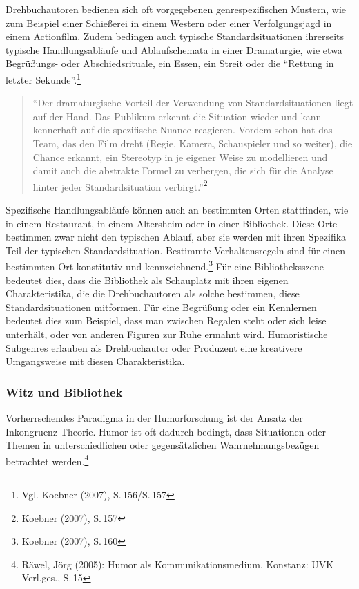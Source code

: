 Drehbuchautoren bedienen sich oft vorgegebenen genrespezifischen
Mustern, wie zum Beispiel einer Schießerei in einem Western oder einer
Verfolgungsjagd in einem Actionfilm. Zudem bedingen auch typische
Standardsituationen ihrerseits typische Handlungsabläufe und
Ablaufschemata in einer Dramaturgie, wie etwa Begrüßungs- oder
Abschiedsrituale, ein Essen, ein Streit oder die \enquote{Rettung in
letzter Sekunde}.\footnote{Vgl. Koebner (2007), S.\,156/S.\,157}

\begin{flushleft}
\begin{quote}
\enquote{Der dramaturgische Vorteil der Verwendung von
Standardsituationen liegt auf der Hand. Das Publikum erkennt die
Situation wieder und kann kennerhaft auf die spezifische Nuance
reagieren. Vordem schon hat das Team, das den Film dreht (Regie, Kamera,
Schauspieler und so weiter), die Chance erkannt, ein Stereotyp in je
eigener Weise zu modellieren und damit auch die abstrakte Formel zu
verbergen, die sich für die Analyse hinter jeder Standardsituation
verbirgt.}\footnote{Koebner (2007), S.\,157}
\end{quote}
\end{flushleft}

Spezifische Handlungsabläufe können auch an bestimmten Orten
stattfinden, wie in einem Restaurant, in einem Altersheim oder in einer
Bibliothek. Diese Orte bestimmen zwar nicht den typischen Ablauf, aber
sie werden mit ihren Spezifika Teil der typischen Standardsituation.
Bestimmte Verhaltensregeln sind für einen bestimmten Ort konstitutiv und
kennzeichnend.\footnote{Koebner (2007), S.\,160} Für eine
Bibliotheksszene bedeutet dies, dass die Bibliothek als Schauplatz mit
ihren eigenen Charakteristika, die die Drehbuchautoren als solche
bestimmen, diese Standardsituationen mitformen. Für eine
Begrüßung oder ein Kennlernen bedeutet dies zum
Beispiel, dass man zwischen Regalen steht oder sich leise unterhält,
oder von anderen Figuren zur Ruhe ermahnt wird. Humoristische Subgenres
erlauben als Drehbuchautor oder Produzent eine kreativere Umgangsweise
mit diesen Charakteristika.

\subsubsection{Witz und Bibliothek}\label{witz-und-bibliothek}

Vorherrschendes Paradigma in der Humorforschung ist der Ansatz der
Inkongruenz-Theorie. Humor ist oft dadurch bedingt, dass Situationen
oder Themen in unterschiedlichen oder gegensätzlichen
Wahrnehmungsbezügen betrachtet werden.\footnote{Räwel, Jörg (2005):
  Humor als Kommunikationsmedium. Konstanz: UVK Verl.ges., S.\,15}

